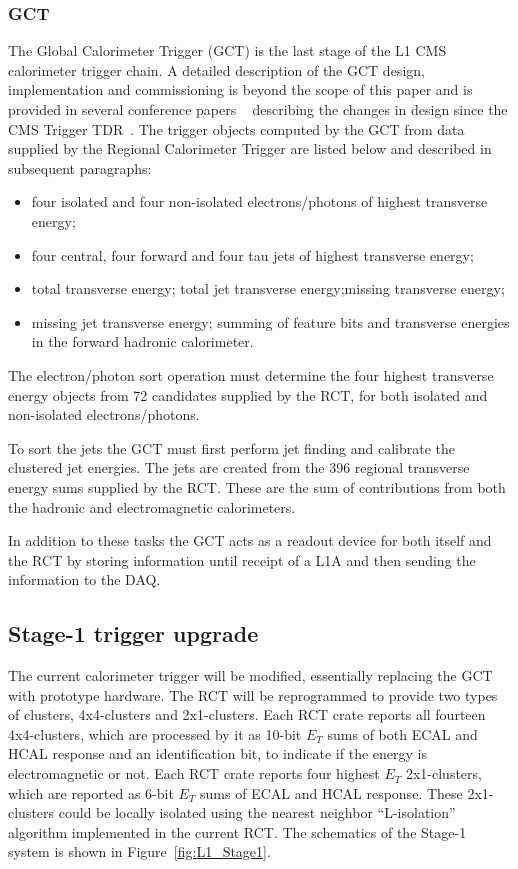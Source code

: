 \subsubsection{GCT}

The Global Calorimeter Trigger (GCT) is the last stage of the L1 CMS calorimeter trigger chain. A detailed description of the GCT design, implementation and commissioning is beyond the scope of this paper and is provided in several conference papers 
~\cite{gct1,gct2} describing the changes in design since the CMS Trigger TDR~\cite{cms_triggerTDR}. The trigger objects computed by the GCT from data supplied by the Regional Calorimeter Trigger are listed below and described 
in subsequent paragraphs:

\begin{itemize}
\item four isolated and four non-isolated electrons/photons of highest transverse energy; 
\item four central, four forward and four tau jets of highest transverse energy; 
\item total transverse energy; total jet transverse energy;missing transverse energy; 
\item missing jet transverse energy; summing of feature bits and transverse energies in the forward hadronic calorimeter.
\end{itemize}

The electron/photon sort operation must determine the four highest transverse energy objects from 72 candidates supplied by the RCT, 
for both isolated and non-isolated electrons/photons.

To sort the jets the GCT must first perform jet finding and calibrate the clustered jet energies. The jets are created from the 396 
regional transverse energy sums supplied by the RCT. These are the sum of contributions from both the hadronic and electromagnetic 
calorimeters.

In addition to these tasks the GCT acts as a readout device for both itself and the RCT by storing information until receipt of a L1A 
and then sending the information to the DAQ.



\subsection {Stage-1 trigger upgrade\label{calo:stage1}}

The current calorimeter trigger will be modified, essentially replacing 
the GCT with prototype hardware. The RCT will
be reprogrammed to provide two types of clusters, 4x4-clusters and
2x1-clusters.  Each RCT crate reports all fourteen 4x4-clusters, which
are processed by it as 10-bit $E_T$ sums of both ECAL and HCAL
response and an identification bit, to indicate if the energy is
electromagnetic or not.  Each RCT crate reports four highest $E_T$
2x1-clusters, which are reported as 6-bit $E_T$ sums of ECAL and HCAL
response.  These 2x1-clusters could be locally isolated using the
nearest neighbor ``L-isolation'' algorithm implemented in the current
RCT. The schematics of the Stage-1 system is shown in Figure~\ref{fig:L1_Stage1}.

